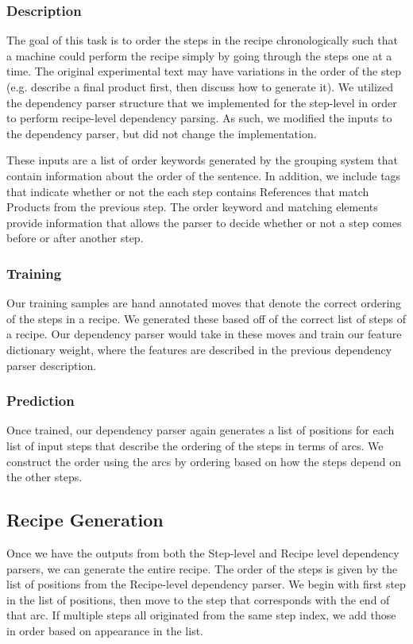 \subsubsection{Description}
The goal of this task is to order the steps in the recipe chronologically such that a machine could perform the recipe simply by going through the steps one at a time. The original experimental text may have variations in the order of the step (e.g. describe a final product first, then discuss how to generate it). We utilized the dependency parser structure that we implemented for the step-level in order to perform recipe-level dependency parsing. As such, we modified the inputs to the dependency parser, but did not change the implementation. 

These inputs are a list of order keywords generated by the grouping system that contain information about the order of the sentence. In addition, we include tags that indicate whether or not the each step contains References that match Products from the previous step. The order keyword and matching elements provide information that allows the parser to decide whether or not a step comes before or after another step. 

\subsubsection{Training}
Our training samples are hand annotated moves that denote the correct ordering of the steps in a recipe. We generated these based off of the correct list of steps of a recipe. Our dependency parser would take in these moves and train our feature dictionary weight, where the features are described in the previous dependency parser description. 

\subsubsection{Prediction}
Once trained, our dependency parser again generates a list of positions for each list of input steps that describe the ordering of the steps in terms of arcs. We construct the order using the arcs by ordering based on how the steps depend on the other steps. 

\subsection{Recipe Generation}
Once we have the outputs from both the Step-level and Recipe level dependency parsers, we can generate the entire recipe. The order of the steps is given by the list of positions from the Recipe-level dependency parser. We begin with first step in the list of positions, then move to the step that corresponds with the end of that arc. If multiple steps all originated from the same step index, we add those in order based on appearance in the list. 

